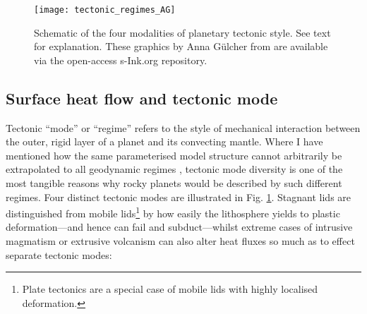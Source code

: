 \begin{figure}
  \centering
  \texttt{[image: tectonic\_regimes\_AG]}
\caption[Schematic of the four modalities of planetary tectonic style.]{Schematic of the four modalities of planetary tectonic style. See text for explanation. These graphics by Anna G\"ulcher from \citet{rolf_dynamics_2022} are available via the open-access s-Ink.org repository.}
\label{fig:tectonic_regimes}
\end{figure}



\subsection{Surface heat flow and tectonic mode}
\label{sec:intro-tectonicmode}

Tectonic ``mode'' or ``regime'' refers to the style of mechanical interaction between the outer, rigid layer of a planet and its convecting mantle. Where I have mentioned how the same parameterised model structure cannot arbitrarily be extrapolated to all geodynamic regimes \citep{seales_assessing_2019}, tectonic mode diversity is one of the most tangible reasons why rocky planets would be described by such different regimes. Four distinct tectonic modes are illustrated in Fig. \ref{fig:tectonic_regimes}. Stagnant lids are distinguished from mobile lids\footnote{Plate tectonics are a special case of mobile lids with highly localised deformation.} by how easily the lithosphere yields to plastic deformation---and hence can fail and subduct---whilst extreme cases of intrusive magmatism or extrusive volcanism can also alter  heat fluxes so much as to effect separate tectonic modes:
